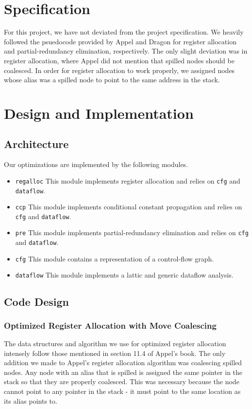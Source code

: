 \documentclass{hw}
\begin{document}
\section{Specification}\label{sec:specification}
For this project, we have not deviated from the project specification. We heavily followed the psuedocode provided by Appel and Dragon for register allocation and partial-redundancy elimination, respectively. The only slight deviation was in register allocation, where Appel did not mention that spilled nodes should be coalesced. In order for register allocation to work properly, we assigned nodes whose alias was a spilled node to point to the same address in the stack.

\section{Design and Implementation}\label{sec:design}
\subsection{Architecture}
Our optimizations are implemented by the following modules.
\begin{itemize}
  \item \texttt{regalloc}
    This module implements register allocation and relies on \texttt{cfg} and \texttt{dataflow}.
    
  \item \texttt{ccp}
    This module implements conditional constant propagation and relies on \texttt{cfg} and \texttt{dataflow}.
    
  \item \texttt{pre}
    This module implements partial-redundancy elimination and relies on \texttt{cfg} and \texttt{dataflow}.

  \item \texttt{cfg}
    This module contains a representation of a control-flow graph.

  \item \texttt{dataflow}
    This module implements a lattic and generic dataflow analysis.
\end{itemize}

\subsection{Code Design}

\subsubsection{Optimized Register Allocation with Move Coalescing}
The data structures and algorithm we use for optimized register allocation intensely follow those mentioned in section 11.4 of Appel's book. The only addition we made to Appel's register allocation algorithm was coalescing spilled nodes. Any node with an alias that is spilled is assigned the same pointer in the stack so that they are properly coalesced. This was necessary because the node cannot point to any pointer in the stack - it must point to the same location as its alias points to.
\end{document}
